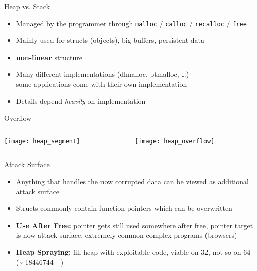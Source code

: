 \documentclass[beamer]{uibk}
\begin{document}
\begin{frame}{Heap vs. Stack}
    \begin{itemize}
        \item Managed by the programmer through \texttt{malloc} /
            \texttt{calloc} / \texttt{recalloc} / \texttt{free}
        \medskip
        \item Mainly used for structs (objects), big buffers, persistent data
        \medskip
        \item \textbf{non-linear} structure
        \medskip
        \item Many different implementations (dlmalloc, ptmalloc, \dots)\\
            some applications come with their own implementation
        \medskip
        \item Details depend \emph{heavily} on implementation
    \end{itemize}
\end{frame}

\begin{frame}{Overflow}
    \begin{columns}
        \begin{column}{0.5\textwidth}
            \begin{center}
                \texttt{[image: heap\_segment]}
            \end{center}
        \end{column}
        \begin{column}{0.5\textwidth}
            \begin{center}
                \texttt{[image: heap\_overflow]}
            \end{center}
        \end{column}
    \end{columns}
\end{frame}

\begin{frame}{Attack Surface}
    \begin{itemize}
        \item Anything that handles the now corrupted data can be viewed as
            additional attack surface
        \medskip
        \pause
        \item Structs commonly contain function pointers which can be
            overwritten
        \bigskip
        \pause
        \item \textbf{Use After Free:} pointer gets still used somewhere after
            free, pointer target is now attack surface, extremely common
            complex programs (browsers)
        \medskip
        \item \textbf{Heap Spraying:} fill heap with exploitable code, viable
            on \SI{32}{\bit}, not so on \SI{64}{\bit} (\textasciitilde
            \SI{18446744}{\tera\byte})
    \end{itemize}
\end{frame}
\end{document}
